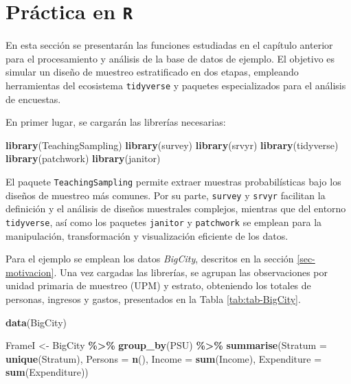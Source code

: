 \documentclass[
  spanish,
  12pt,
]{book}
\newenvironment{Shaded}{\begin{snugshade}}{\end{snugshade}}
\newcommand{\AttributeTok}[1]{\textcolor[rgb]{0.13,0.29,0.53}{#1}}
\newcommand{\FunctionTok}[1]{\textcolor[rgb]{0.13,0.29,0.53}{\textbf{#1}}}
\newcommand{\NormalTok}[1]{#1}
\newcommand{\OtherTok}[1]{\textcolor[rgb]{0.56,0.35,0.01}{#1}}
\newcommand{\SpecialCharTok}[1]{\textcolor[rgb]{0.81,0.36,0.00}{\textbf{#1}}}
\newcommand{\StringTok}[1]{\textcolor[rgb]{0.31,0.60,0.02}{#1}}
\begin{document}
\section{\texorpdfstring{Práctica en \texttt{R}}{Práctica en R}}\label{pruxe1ctica-en-r}

En esta sección se presentarán las funciones estudiadas en el capítulo anterior para el procesamiento y análisis de la base de datos de ejemplo. El objetivo es simular un diseño de muestreo estratificado en dos etapas, empleando herramientas del ecosistema \texttt{tidyverse} y paquetes especializados para el análisis de encuestas.

En primer lugar, se cargarán las librerías necesarias:

\begin{Shaded}
\begin{Highlighting}[]
\FunctionTok{library}\NormalTok{(TeachingSampling)}
\FunctionTok{library}\NormalTok{(survey)}
\FunctionTok{library}\NormalTok{(srvyr)}
\FunctionTok{library}\NormalTok{(tidyverse)}
\FunctionTok{library}\NormalTok{(patchwork)}
\FunctionTok{library}\NormalTok{(janitor)}
\end{Highlighting}
\end{Shaded}

El paquete \texttt{TeachingSampling} permite extraer muestras probabilísticas bajo los diseños de muestreo más comunes. Por su parte, \texttt{survey} y \texttt{srvyr} facilitan la definición y el análisis de diseños muestrales complejos, mientras que del entorno \texttt{tidyverse}, así como los paquetes \texttt{janitor} y \texttt{patchwork} se emplean para la manipulación, transformación y visualización eficiente de los datos.

Para el ejemplo se emplean los datos \emph{BigCity}, descritos en la sección \ref{sec-motivacion}. Una vez cargadas las librerías, se agrupan las observaciones por unidad primaria de muestreo (UPM) y estrato, obteniendo los totales de personas, ingresos y gastos, presentados en la Tabla \ref{tab:tab-BigCity}.

\begin{Shaded}
\begin{Highlighting}[]
\FunctionTok{data}\NormalTok{(}\StringTok{\textquotesingle{}BigCity\textquotesingle{}}\NormalTok{)}

\NormalTok{FrameI }\OtherTok{\textless{}{-}}\NormalTok{ BigCity }\SpecialCharTok{\%\textgreater{}\%} 
          \FunctionTok{group\_by}\NormalTok{(PSU) }\SpecialCharTok{\%\textgreater{}\%}
          \FunctionTok{summarise}\NormalTok{(}\AttributeTok{Stratum =} \FunctionTok{unique}\NormalTok{(Stratum),}
                    \AttributeTok{Persons =} \FunctionTok{n}\NormalTok{(),}
                    \AttributeTok{Income =} \FunctionTok{sum}\NormalTok{(Income),}
                    \AttributeTok{Expenditure =} \FunctionTok{sum}\NormalTok{(Expenditure))}
\end{Highlighting}
\end{Shaded}
\end{document}
